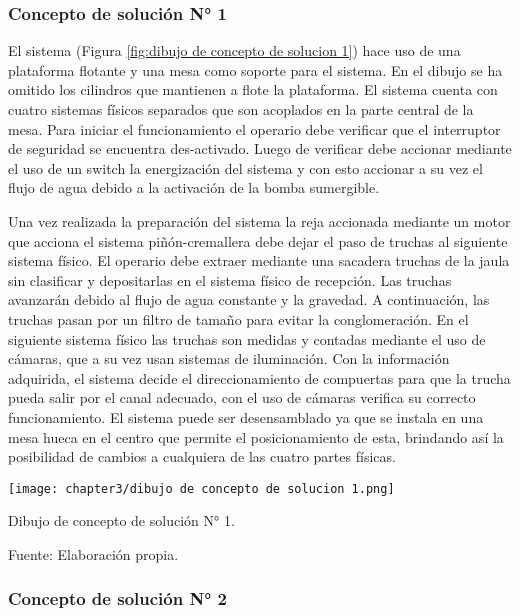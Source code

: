 \subsubsection{Concepto de solución N° 1}

El sistema (Figura \ref{fig:dibujo de concepto de solucion 1}) hace uso de una plataforma flotante y una mesa como soporte para el sistema. En el dibujo se ha omitido los cilindros que mantienen a flote la plataforma. El sistema cuenta con cuatro sistemas físicos separados que son acoplados en la parte central de la mesa. Para iniciar el funcionamiento el operario debe verificar que el interruptor de seguridad se encuentra des-activado. Luego de verificar debe accionar mediante el uso de un switch la energización del sistema y con esto accionar a su vez el flujo de agua debido a la activación de la bomba sumergible.

Una vez realizada la preparación del sistema la reja accionada mediante un motor que acciona el sistema piñón-cremallera debe dejar el paso de truchas al siguiente sistema físico. El operario debe extraer mediante una sacadera truchas de la jaula sin clasificar y depositarlas en el sistema físico de recepción. Las truchas avanzarán debido al flujo de agua constante y la gravedad. A continuación, las truchas pasan por un filtro de tamaño para evitar la conglomeración. En el siguiente sistema físico las truchas son medidas y contadas mediante el uso de cámaras, que a su vez usan sistemas de iluminación. Con la información adquirida, el sistema decide el direccionamiento de compuertas para que la trucha pueda salir por el canal adecuado, con el uso de cámaras verifica su correcto funcionamiento.
El sistema puede ser desensamblado ya que se instala en una mesa hueca en el centro que permite el posicionamiento de esta, brindando así la posibilidad de cambios a cualquiera de las cuatro partes físicas.


\begin{myfigure}[H]
	\footnotesize\centering
	\texttt{[image: chapter3/dibujo de concepto de solucion 1.png]}
	\caption{Dibujo de concepto de solución N° 1.}
	\begin{myflushcenter}
		Fuente: Elaboración propia.
	\end{myflushcenter}
	\label{fig:dibujo de concepto de solucion 1}
\end{myfigure}


\subsubsection{Concepto de solución N° 2}

